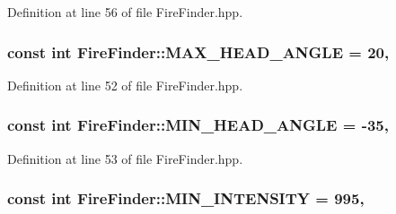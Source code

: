 Definition at line 56 of file Fire\-Finder.\-hpp.

\hypertarget{classFireFinder_ace5a0c6c6435a4d36377dc94a5f785db}{
\subsubsection[{M\-A\-X\-\_\-\-H\-E\-A\-D\-\_\-\-A\-N\-G\-L\-E}]{\setlength{\rightskip}{0pt plus 5cm}const int Fire\-Finder\-::\-M\-A\-X\-\_\-\-H\-E\-A\-D\-\_\-\-A\-N\-G\-L\-E = 20\hspace{0.3cm}{\ttfamily [static]}, {\ttfamily [private]}}}\label{classFireFinder_ace5a0c6c6435a4d36377dc94a5f785db}


Definition at line 52 of file Fire\-Finder.\-hpp.

\hypertarget{classFireFinder_ac6743699fd08f97088855dc1e87f8dea}{
\subsubsection[{M\-I\-N\-\_\-\-H\-E\-A\-D\-\_\-\-A\-N\-G\-L\-E}]{\setlength{\rightskip}{0pt plus 5cm}const int Fire\-Finder\-::\-M\-I\-N\-\_\-\-H\-E\-A\-D\-\_\-\-A\-N\-G\-L\-E = -\/35\hspace{0.3cm}{\ttfamily [static]}, {\ttfamily [private]}}}\label{classFireFinder_ac6743699fd08f97088855dc1e87f8dea}


Definition at line 53 of file Fire\-Finder.\-hpp.

\hypertarget{classFireFinder_aa05ce7d7760ac59ea294df68475dcf05}{
\subsubsection[{M\-I\-N\-\_\-\-I\-N\-T\-E\-N\-S\-I\-T\-Y}]{\setlength{\rightskip}{0pt plus 5cm}const int Fire\-Finder\-::\-M\-I\-N\-\_\-\-I\-N\-T\-E\-N\-S\-I\-T\-Y = 995\hspace{0.3cm}{\ttfamily [static]}, {\ttfamily [private]}}}\label{classFireFinder_aa05ce7d7760ac59ea294df68475dcf05}


